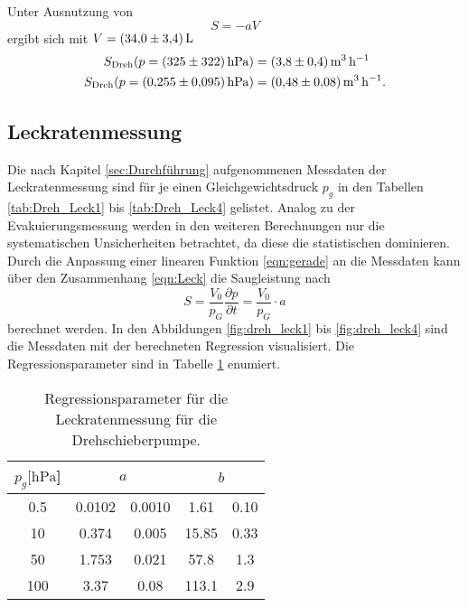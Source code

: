 Unter Ausnutzung von 
\begin{equation}
  S=-aV
  \label{eqn:evak}
\end{equation}
ergibt sich mit $V=\SI{34\pm 3.4}{\litre}$
\begin{align*}
  S_\text{Dreh}(p=\SI{325\pm 322}{\hecto\pascal})&=\SI[per-mode=reciprocal]{3.8 \pm 0.4}{\cubic\metre\per\hour}\\
  S_\text{Dreh}(p=\SI{0.255\pm 0.095}{\hecto\pascal})&=\SI[per-mode=reciprocal]{0.48 \pm 0.08}{\cubic\metre\per\hour}.
\end{align*}
\subsection{Leckratenmessung}
Die nach Kapitel \ref{sec:Durchführung} aufgenommenen Messdaten der Leckratenmessung sind 
für je einen Gleichgewichtsdruck $p_g$ in den Tabellen \ref{tab:Dreh_Leck1} bis \ref{tab:Dreh_Leck4}
gelistet. Analog zu der Evakuierungsmessung werden in den weiteren Berechnungen nur die systematischen
Unsicherheiten betrachtet, da diese die statistischen dominieren. 
Durch die Anpassung einer linearen Funktion \ref{eqn:gerade} an die Messdaten kann über den 
Zusammenhang \ref{eqn:Leck} die Saugleistung nach
\begin{equation}
  S=\frac{V_0}{p_G}\frac{\partial p}{\partial t}=\frac{V_0}{p_G}\cdot a
  \label{eqn:Leck2}
\end{equation} 
berechnet werden.
In den Abbildungen \ref{fig:dreh_leck1} bis \ref{fig:dreh_leck4} sind die Messdaten mit der 
berechneten Regression visualisiert.
Die Regressionsparameter sind in Tabelle \ref{tab:Dreh_Leck_para} enumiert.
\begin{table}[H]
  \centering
    \caption{Regressionsparameter für die Leckratenmessung für die Drehschieberpumpe.}
    \label{tab:Dreh_Leck_para}
    \begin{tabular}{c c @{${}\pm{}$} c c @{${}\pm{}$} c}
      \toprule
      {$p_g [\si{\hecto\pascal}$]} & \multicolumn{2}{c}{$a$} & \multicolumn{2}{c}{$b$} \\
      \midrule
      0.5 & 0.0102 & 0.0010 & 1.61  & 0.10\\
      10  & 0.374  & 0.005  & 15.85 & 0.33\\
      50  & 1.753  & 0.021  & 57.8  & 1.3\\
      100 & 3.37   & 0.08   & 113.1 & 2.9\\
      \bottomrule
    \end{tabular}
\end{table}
